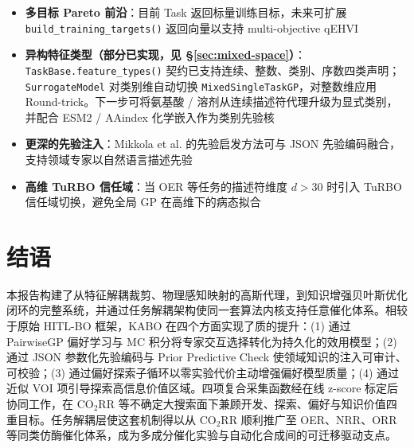 \documentclass[12pt,a4paper]{article}
\begin{document}
\begin{itemize}
    \item \textbf{多目标 Pareto 前沿}：目前 Task 返回标量训练目标，未来可扩展 \texttt{build\_training\_targets()} 返回向量以支持 multi-objective qEHVI\cite{botorch2019}
    \item \textbf{异构特征类型（部分已实现，见 §\ref{sec:mixed-space}）}：\texttt{TaskBase.feature\_types()} 契约已支持连续、整数、类别、序数四类声明；\texttt{SurrogateModel} 对类别维自动切换 \texttt{MixedSingleTaskGP}\cite{ru2020cocabo}，对整数维应用 Round-trick\cite{garrido2020round}。下一步可将氨基酸 / 溶剂从连续描述符代理升级为显式类别，并配合 ESM2 / AAindex 化学嵌入作为类别先验核\cite{catbox2025}
    \item \textbf{更深的先验注入}：Mikkola et al.\cite{mikkola2021prior} 的先验启发方法可与 JSON 先验编码融合，支持领域专家以自然语言描述先验
    \item \textbf{高维 TuRBO 信任域}：当 OER 等任务的描述符维度 $d > 30$ 时引入 TuRBO\cite{turbo2019} 信任域切换，避免全局 GP 在高维下的病态拟合
\end{itemize}


\section{结语}

本报告构建了从特征解耦裁剪、物理感知映射的高斯代理，到知识增强贝叶斯优化闭环的完整系统，并通过任务解耦架构使同一套算法内核支持任意催化体系。相较于原始 HITL-BO 框架，KABO 在四个方面实现了质的提升：(1) 通过 PairwiseGP 偏好学习与 MC 积分将专家交互选择转化为持久化的效用模型；(2) 通过 JSON 参数化先验编码与 Prior Predictive Check 使领域知识的注入可审计、可校验；(3) 通过偏好探索子循环以零实验代价主动增强偏好模型质量；(4) 通过近似 VOI 项引导探索高信息价值区域。四项复合采集函数经在线 z-score 标定后协同工作，在 CO$_2$RR 等不确定大搜索面下兼顾开发、探索、偏好与知识价值四重目标。任务解耦层使这套机制得以从 CO$_2$RR 顺利推广至 OER、NRR、ORR 等同类仿酶催化体系，成为多成分催化实验与自动化合成间的可迁移驱动支点。
\end{document}
